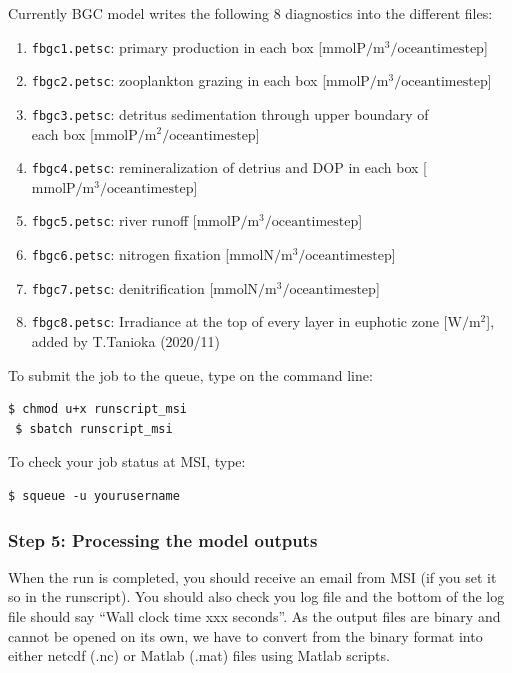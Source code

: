 \documentclass[a4paper]{article}
\def\noin{\noindent }
\begin{document}
\noin Currently BGC model writes the following 8 diagnostics into the different files:
\begin{enumerate}
\item \verb|fbgc1.petsc|: primary production in each box [$\mathrm{mmol P/m^3/oceantimestep}$]
\item \verb|fbgc2.petsc|: zooplankton grazing in each box  [$\mathrm{mmol P/m^3/oceantimestep}$]
\item \verb|fbgc3.petsc|: detritus sedimentation through upper boundary of \\ each box  [$\mathrm{mmol P/m^2/oceantimestep}$]
\item \verb|fbgc4.petsc|: remineralization of detrius and DOP in each box [$\mathrm{mmol P/m^3/oceantimestep}$]
\item \verb|fbgc5.petsc|: river runoff  [$\mathrm{mmol P/m^3/oceantimestep}$]
\item \verb|fbgc6.petsc|: nitrogen fixation  [$\mathrm{mmol N/m^3/oceantimestep}$]
\item \verb|fbgc7.petsc|: denitrification  [$\mathrm{mmol N/m^3/oceantimestep}$]
\item \verb|fbgc8.petsc|: Irradiance at the top of every layer in euphotic zone [$\mathrm{W/m^2}$], added by T.Tanioka (2020/11)
\end{enumerate}

\noin To submit the job to the queue, type on the command line:
\begin{lstlisting}[style=DOS]
 $ chmod u+x runscript_msi
 $ sbatch runscript_msi
\end{lstlisting}

\noin To check your job status at MSI, type:
\begin{lstlisting}[style=DOS]
 $ squeue -u yourusername
\end{lstlisting}

\subsubsection{Step 5: Processing the model outputs}

\noin When the run is completed, you should receive an email from MSI (if you set it so in the runscript). You should also check you log file and the bottom of the log file should say ``Wall clock time xxx seconds''. As the output files are binary and cannot be opened on its own, we have to convert from the binary format into either netcdf (.nc) or Matlab (.mat) files using Matlab scripts.
\end{document}

